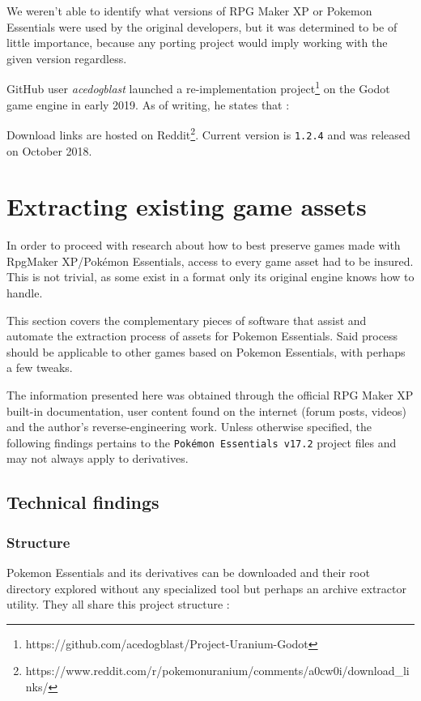 \documentclass[11pt]{article}
\begin{document}
{We weren't able to identify what versions of RPG Maker XP or Pokemon Essentials were used by the original developers, but it was determined to be of little importance, because any porting project would imply working with the given version regardless.
	
GitHub user \textit{acedogblast} launched a re-implementation project\footnote{https://github.com/acedogblast/Project-Uranium-Godot} on the Godot game engine in early 2019. As of writing, he states that :
	
Download links are hosted on Reddit\footnote{https://www.reddit.com/r/pokemonuranium/comments/a0cw0i/download\_links/}. Current version is \verb|1.2.4| and was released on October  2018.



\newpage 
\section{Extracting existing game assets}

In order to proceed with research about how to best preserve games made with RpgMaker XP/Pokémon Essentials, access to every game asset had to be insured. This is not trivial, as some exist in a format only its original engine knows how to handle.

This section covers the complementary pieces of software that assist and automate the extraction process of assets for Pokemon Essentials. Said process should be applicable to other games based on Pokemon Essentials, with perhaps a few tweaks.

The information presented here was obtained through the official RPG Maker XP built-in documentation, user content found on the internet (forum posts, videos) and the author's reverse-engineering work. Unless otherwise specified, the following findings pertains to the \texttt{Pokémon Essentials v17.2} project files and may not always apply to derivatives. 


\subsection{Technical findings}

\subsubsection{Structure}

Pokemon Essentials and its derivatives can be downloaded and their root directory explored without any specialized tool but perhaps an archive extractor utility. They all share this project structure :

}
\end{document}
